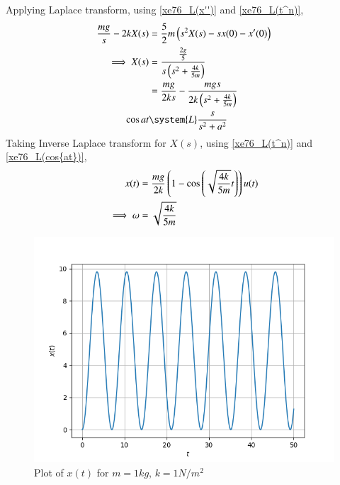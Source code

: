 \documentclass[journal,12pt,twocolumn]{IEEEtran}
\theoremstyle{remark}
\begin{document}
Applying Laplace transform, using \eqref{xe76_L(x'')} and \eqref{xe76_L(t^n)},
\begin{align}
\frac{mg}{s}-2kX(s)&=\frac{5}{2}m\brak{s^2X(s)-sx(0)-x'(0)}\\
\implies X(s) &= \frac{\frac{2g}{5}}{s\brak{s^2+\frac{4k}{5m}}}\\
&= \frac{mg}{2ks}-\frac{mgs}{2k\brak{s^2+\frac{4k}{5m}}}\\
\label{xe76_L(cos{at})} \cos{at} &\system{L} \frac{s}{s^2+a^2}
\end{align}
Taking Inverse Laplace transform for $X(s)$, using \eqref{xe76_L(t^n)} and \eqref{xe76_L(cos{at})},
\begin{align}
x(t) &= \frac{mg}{2k}\left(1-\cos{\ensuremath{\left(\sqrt{\frac{4k}{5m}}t\right)}}\right)u(t)\\
\implies \omega &= \sqrt{\frac{4k}{5m}}
\end{align}
\begin{figure}[htbp]
	\includegraphics[width=\columnwidth]{figs/plot.png}
	\caption{Plot of $x(t)$ for $m=1kg$, $k=1N/m^2$}
	\label{fig:plot_xe76}
\end{figure}
\end{document}
